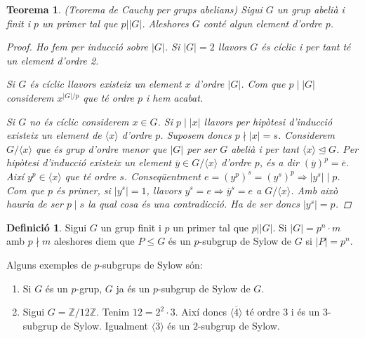 \documentclass[a4paper,11pt]{report}
\renewcommand{\div}{\mid}
\newcommand{\ordre}[1]{|#1|}
\renewcommand{\bar}{\overline}
\theoremstyle{theorem}
\newtheorem{teorema}{\normalfont \sffamily\bfseries Teorema}[section]
\theoremstyle{definition}
\newtheorem{definicio}{\normalfont\sffamily\bfseries Definició}[section]
\begin{document}
\begin{teorema}{(Teorema de Cauchy per grups abelians)} Sigui $G$ un grup abelià i finit i $p$ un primer tal que $p\big| |G|$. Aleshores $G$ conté algun element d'ordre $p$.
	\begin{proof}
		Ho fem per inducció sobre $|G|$. Si $|G|=2$ llavors $G$ és cíclic i per tant té un element d'ordre 2.
		
		Si $G$ és cíclic llavors existeix un element $x$ d'ordre $\ordre{G}$. Com que $p\div\ordre{G}$ considerem $x^{\ordre{G}/p}$ que té ordre $p$ i hem acabat.
		
		Si $G$ no és cíclic considerem $x\in G$. Si $p\div\ordre{x}$ llavors per hipòtesi d'inducció existeix un element de $\langle x\rangle$ d'ordre $p$. Suposem doncs $p\nmid\ordre{x}=s$. Considerem $G/\langle x\rangle$ que és grup d'ordre menor que $\ordre{G}$ per ser $G$ abelià i per tant $\langle x\rangle\unlhd G$. Per hipòtesi d'inducció existeix un element $\bar{y}\in G/\langle x\rangle$ d'ordre $p$, és a dir $(\bar{y})^p=\bar{e}$. Així $y^p\in\langle x\rangle$ que té ordre $s$. Conseqüentment $e=(y^p)^s=(y^s)^p\Rightarrow \ordre{y^s}\div p$. Com que $p$ és primer,
		 si $\ordre{y^s}=1$, llavors $y^s=e\Rightarrow \bar{y}^s=e$ a $G/\langle x\rangle$. Amb això hauria de ser $p\div s$ la qual cosa és una contradicció. Ha de ser doncs $\ordre{y^s}=p$.
		
	\end{proof}
\end{teorema}
\begin{definicio}
	Sigui $G$ un grup finit i $p$ un primer tal que $p\big| |G|$. Si $|G|=p^n\cdot m$ amb $p\nmid m$ aleshores diem que $P\leq G$ és un $p$-subgrup de Sylow de $G$ si $|P|=p^n$.
\end{definicio}
Alguns exemples de $p$-subgrups de Sylow són:
\begin{enumerate}
	\item Si $G$ és un $p$-grup, $G$ ja és un $p$-subgrup de Sylow de $G$.
	\item Sigui $G=\mathbb{Z}/12\mathbb{Z}$. Tenim $12=2^2\cdot 3$. Així doncs $\langle \bar{4}\rangle$ té ordre 3 i és un $3$-subgrup de Sylow. Igualment $\langle\bar{3}\rangle$ és un $2$-subgrup de Sylow.
\end{enumerate}
\end{document}
